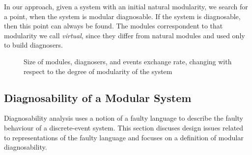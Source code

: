 In our approach, given a system with an initial natural modularity, we search
for a point, when the system is modular diagnosable. If the system is diagnosable,
then this point can always be found. The modules correspondent to that
modularity we call \emph{virtual}, since they differ from natural modules and
used only to build diagnosers.

\begin{figure}[t]
\centering
{}
\caption{Size of modules, diagnosers, and events exchange rate, changing 
with respect to the degree of modularity of the system}
\label{fig:curves}
\end{figure}



\subsection{Diagnosability of a Modular System}

Diagnosability analysis uses a notion of a faulty language to describe the
faulty behaviour of a discrete-event system. This section discuses design issues
related to representations of the faulty language and focuses on a definition
of modular diagnosability.

